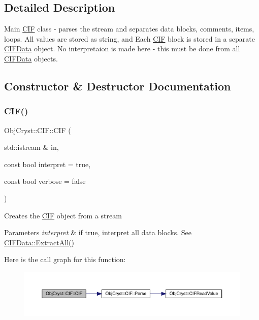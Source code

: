 \subsection{Detailed Description}
Main \mbox{\hyperlink{class_obj_cryst_1_1_c_i_f}{C\+IF}} class -\/ parses the stream and separates data blocks, comments, items, loops. All values are stored as string, and Each \mbox{\hyperlink{class_obj_cryst_1_1_c_i_f}{C\+IF}} block is stored in a separate \mbox{\hyperlink{class_obj_cryst_1_1_c_i_f_data}{C\+I\+F\+Data}} object. No interpretaion is made here -\/ this must be done from all \mbox{\hyperlink{class_obj_cryst_1_1_c_i_f_data}{C\+I\+F\+Data}} objects. 

\subsection{Constructor \& Destructor Documentation}
\mbox{\label{class_obj_cryst_1_1_c_i_f_ad570039a62026b01b0fdbcd9f9480d7a}} 
\subsubsection{\texorpdfstring{CIF()}{CIF()}}
{\footnotesize\ttfamily Obj\+Cryst\+::\+C\+I\+F\+::\+C\+IF (\begin{DoxyParamCaption}\item[{std\+::istream \&}]{in,  }\item[{const bool}]{interpret = {\ttfamily true},  }\item[{const bool}]{verbose = {\ttfamily false} }\end{DoxyParamCaption})}

Creates the \mbox{\hyperlink{class_obj_cryst_1_1_c_i_f}{C\+IF}} object from a stream


\begin{DoxyParams}{Parameters}
{\em interpret} & if true, interpret all data blocks. See \mbox{\hyperlink{class_obj_cryst_1_1_c_i_f_data_a406e1448ca864b4d679edde83c6351ab}{C\+I\+F\+Data\+::\+Extract\+All()}} \\
\hline
\end{DoxyParams}
Here is the call graph for this function\+:
\nopagebreak
\begin{figure}[H]
\begin{center}
\leavevmode
\includegraphics[width=350pt]{class_obj_cryst_1_1_c_i_f_ad570039a62026b01b0fdbcd9f9480d7a_cgraph}
\end{center}
\end{figure}


